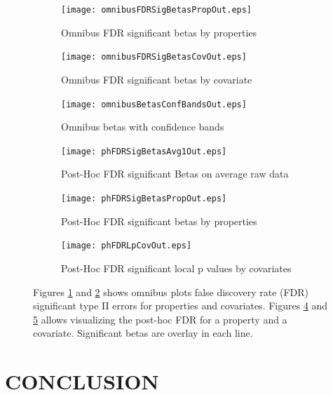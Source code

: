 \documentclass[]{spie}  %
\begin{document}
\begin{figure}
	\centering
	\begin{subfigure}{0.45\textwidth}
		\texttt{[image: omnibusFDRSigBetasPropOut.eps]}
	   	\caption{Omnibus FDR significant betas by properties}
	   	\label{fig:omnibusFDRSigBetasTab}
	\end{subfigure}
	\begin{subfigure}{0.45\textwidth}
		\texttt{[image: omnibusFDRSigBetasCovOut.eps]}
	   	\caption{Omnibus FDR significant betas by covariate}
	   	\label{fig:omnibusFDRSigBetasCov}
	\end{subfigure}

	\begin{subfigure}{0.45\textwidth}
		\texttt{[image: omnibusBetasConfBandsOut.eps]}
	   	\caption{Omnibus betas with confidence bands}
	   	\label{fig:omnibusBetasConfBands}
	\end{subfigure}
	\begin{subfigure}{0.45\textwidth}
		\texttt{[image: phFDRSigBetasAvg1Out.eps]}
	   	\caption{Post-Hoc FDR significant Betas on average raw data}
	   	\label{fig:phFDRSigBetasAvg1}
	\end{subfigure}

	\begin{subfigure}{0.45\textwidth}
		\texttt{[image: phFDRSigBetasPropOut.eps]}
	   	\caption{Post-Hoc FDR significant betas by properties}
	   	\label{fig:phFDRSigBetasProp}
	\end{subfigure}
	\begin{subfigure}{0.45\textwidth}
		\texttt{[image: phFDRLpCovOut.eps]}
	   	\caption{Post-Hoc FDR significant local p values by covariates}
	   	\label{fig:phFDRLpCov}
	\end{subfigure}
	
	\caption{Figures \ref{fig:omnibusFDRSigBetasTab} and \ref{fig:omnibusFDRSigBetasCov} 
	shows omnibus plots false discovery rate (FDR) significant type II errors for 
	properties and covariates. Figures \ref{fig:phFDRSigBetasAvg1} and \ref{fig:phFDRSigBetasProp} 
	allows visualizing the post-hoc FDR for a property and a covariate.
	Significant betas are overlay in each line.}
	\label{fig:omnibusph}
\end{figure}


\section{CONCLUSION} 
\label{sec:CONCLUSION}
\end{document}

